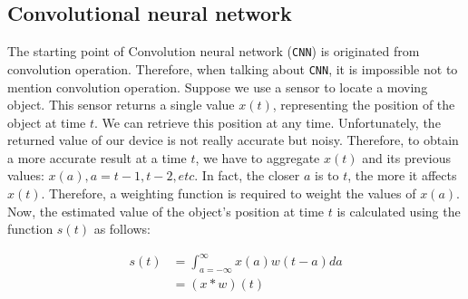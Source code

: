 
\subsection{Convolutional neural network}


The starting point of Convolution neural network (\verb|CNN|) is originated from convolution operation. Therefore, when talking about \verb|CNN|, it is impossible not to mention convolution operation. Suppose we use a sensor to locate a moving object. This sensor returns a single value $x(t)$, representing the position of the object at time $t$. We can retrieve this position at any time. Unfortunately, the returned value of our device is not really accurate but noisy. Therefore, to obtain a more accurate result at a time $t$, we have to aggregate $x(t)$ and its previous values: $x(a), a=t-1, t-2, etc.$ In fact, the closer $a$ is to $t$, the more it affects $x(t)$. Therefore, a weighting function is required to weight the values of $x(a)$. Now, the estimated value of the object's position at time $t$ is calculated using the function $s(t)$ as follows:

\begin{align}
    s(t) &= \int_{a=-\infty}^\infty{x(a) w(t-a) da}\\
    &= (x*w)(t)
\end{align}


